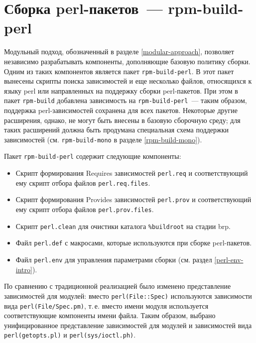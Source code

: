 \documentclass[russian,a4paper,12pt,titlepage]{article}
\begin{document}
\section{Сборка perl-пакетов~--- rpm-build-perl}
Модульный подход, обозначенный в разделе \ref{modular-approach}, позволяет независимо разрабатывать
компоненты, дополняющие базовую политику сборки.  Одним из таких компонентов является пакет \verb|rpm-build-perl|.
В этот пакет вынесены скрипты поиска зависимостей и еще несколько файлов, относящихся к языку perl или направленных
на поддержку сборки perl-пакетов.  При этом в пакет \verb|rpm-build| добавлена зависимость на \verb|rpm-build-perl|~---
таким образом, поддержка perl-зависимостей сохранена для всех пакетов.  Некоторые другие расширения,
однако, не могут быть внесены в базовую сборочную среду; для таких расширений должна быть продумана специальная
схема поддержки зависимостей (см. \verb|rpm-build-mono| в разделе \ref{rpm-build-mono}).

Пакет \verb|rpm-build-perl| содержит следующие компоненты:
\begin{itemize}
\item Скрипт формирования Requires зависимостей \verb|perl.req| и соответствующий ему скрипт отбора файлов \verb|perl.req.files|.
\item Скрипт формирования Provides зависимостей \verb|perl.prov| и соответствующий ему скрипт отбора файлов \verb|perl.prov.files|.
\item Скрипт \verb|perl.clean| для очистики каталога \verb|%buildroot| на стадии brp.
\item Файл \verb|perl.def| с макросами, которые используются при сборке perl-пакетов.
\item Файл \verb|perl.env| для управления параметрами сборки (см. раздел \ref{perl-env-intro}).
\end{itemize}

По сравнению с традиционной реализацией было изменено представление зависимостей для модулей:
вместо \verb|perl(File::Spec)| используются зависимости вида \verb|perl(File/Spec.pm)|,
т.\,е. вместо имени модуля используется соответствующие компоненты имени файла.
Таким образом, выбрано унифицированное представление зависимостей для модулей и зависимостей
вида \verb|perl(getopts.pl)| и \verb|perl(sys/ioctl.ph)|.
\end{document}
